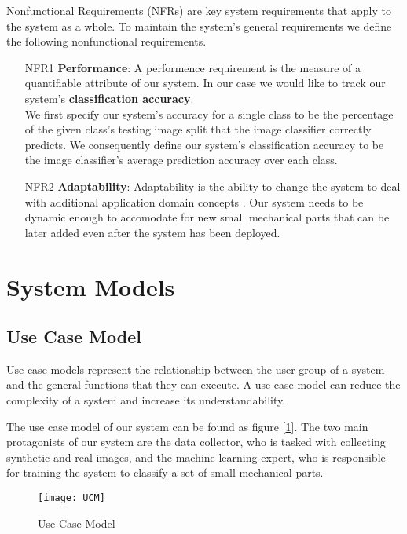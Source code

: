 Nonfunctional Requirements (NFRs) are key system requirements that apply to the system as a whole. To maintain the system's general requirements we define the following nonfunctional requirements.

\begin{itemize}
  \item [NFR1] \textbf{Performance}: A performence requirement is the measure of a quantifiable attribute of our system. In our case we would like to track our system's \textbf{classification accuracy}.\\
  We first specify our system's accuracy for a single class to be the percentage of the given class's testing image split that the image classifier correctly predicts. We consequently define our system's classification accuracy to be the image classifier's average prediction accuracy over each class.

  \item [NFR2] \textbf{Adaptability}: Adaptability is the ability to change the system to deal with additional application domain concepts \cite{bruegge2004object}. Our system needs to be dynamic enough to accomodate for new small mechanical parts that can be later added even after the system has been deployed.
\end{itemize}

\section{System Models}

\subsection{Use Case Model}

Use case models represent the relationship between the user group of a system and the general functions that they can execute. A use case model can reduce the complexity of a system and increase its understandability.

The use case model of our system can be found as figure [\ref{fig:UCM}]. The two main protagonists of our system are the data collector, who is tasked with collecting synthetic and real images, and the machine learning expert, who is responsible for training the system to classify a set of small mechanical parts.

\begin{figure}[h]
\centering
  \texttt{[image: UCM]}
\caption{Use Case Model}
\label{fig:UCM}
\end{figure}

